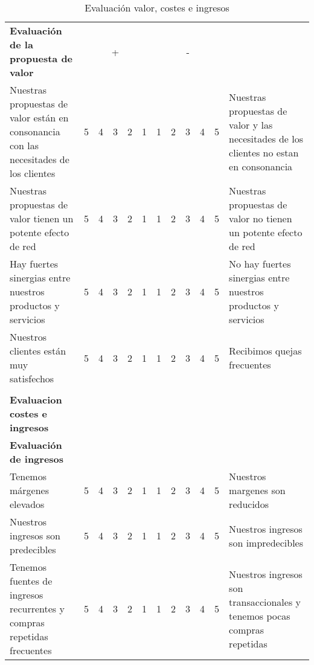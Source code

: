 \documentclass[11pt]{book}
\begin{document}
\begin{table}[htbp]
  \centering
  \caption{Evaluación valor, costes e ingresos}
    \begin{tabular}{p{14.285em}ccccc|cccccp{12em}}
    \textcolor[rgb]{ 1,  0,  0}{\textbf{Evaluación de la propuesta de valor}} & \multicolumn{5}{p{3.225em}}{\textcolor[rgb]{ .557,  .663,  .859}{+}} & \multicolumn{5}{p{3.225em}}{-}        & \multicolumn{1}{r}{} \\
    Nuestras propuestas de valor están en consonancia con las necesitades de los clientes & 5     & 4     & 3     & 2     & 1     & 1     & 2     & 3     & 4     & 5     & Nuestras propuestas de valor y las necesitades de los clientes no estan en consonancia \\
    Nuestras propuestas de valor tienen un potente efecto de red & 5     & 4     & 3     & 2     & 1     & 1     & 2     & 3     & 4     & 5     & Nuestras propuestas de valor no tienen un potente efecto de red \\
    Hay fuertes sinergias entre nuestros productos y servicios & 5     & 4     & 3     & 2     & 1     & 1     & 2     & 3     & 4     & 5     & No hay fuertes sinergias entre nuestros productos y servicios \\
    Nuestros clientes están muy satisfechos & 5     & 4     & 3     & 2     & 1     & 1     & 2     & 3     & 4     & 5     & Recibimos quejas frecuentes \\
    \multicolumn{1}{r}{} &       &       &       &       & \multicolumn{1}{c}{} &       &       &       &       &       & \multicolumn{1}{r}{} \\
    \textcolor[rgb]{ 1,  0,  0}{\textbf{Evaluacion costes e ingresos}} &       &       &       &       & \multicolumn{1}{c}{} &       &       &       &       &       & \multicolumn{1}{r}{} \\
    \multicolumn{1}{l}{\textbf{Evaluación de ingresos}} &       &       &       &       & \multicolumn{1}{c}{} &       &       &       &       &       & \multicolumn{1}{r}{} \\
    Tenemos márgenes elevados & 5     & 4     & 3     & 2     & 1     & 1     & 2     & 3     & 4     & 5     & Nuestros margenes son reducidos \\
    Nuestros ingresos son predecibles & 5     & 4     & 3     & 2     & 1     & 1     & 2     & 3     & 4     & 5     & Nuestros ingresos son impredecibles \\
    Tenemos fuentes de ingresos recurrentes y compras repetidas frecuentes & 5     & 4     & 3     & 2     & 1     & 1     & 2     & 3     & 4     & 5     & Nuestros ingresos son transaccionales y tenemos pocas compras repetidas \\

\end{tabular}
\end{table}
\end{document}
